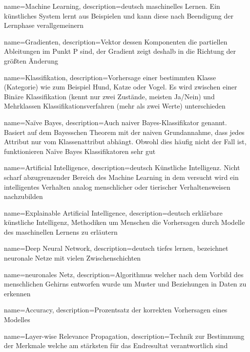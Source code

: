 
{
	name=Machine Learning,
	description={deutsch maschinelles Lernen. Ein künstliches System lernt aus Beispielen und kann diese nach Beendigung der Lernphase verallgemeinern}
}

{
	name=Gradienten,
	description={Vektor dessen Komponenten die partiellen Ableitungen im Punkt P sind, der Gradient zeigt deshalb in die Richtung der größten Änderung}
}

{
	name=Klassifikation,
	description={Vorhersage einer bestimmten Klasse (Kategorie) wie zum Beispiel Hund, Katze oder Vogel. Es wird zwischen einer Binäre Klassifikation (kennt nur zwei Zustände, meisten Ja/Nein) und Mehrklassen Klassifikationsverfahren (mehr als zwei Werte) unterschieden}
}

{
	name=Naïve Bayes,
	description={Auch naiver Bayes-Klassifikator genannt. Basiert auf dem Bayesschen Theorem mit der naiven Grundannahme, dass jedes Attribut nur vom Klassenattribut abhängt. Obwohl dies häufig nicht der Fall ist, funktionieren Naïve Bayes Klassifikatoren sehr gut}
}

{
	name=Artificial Intelligence,
	description={deutsch Künstliche Intelligenz. Nicht scharf abzugrenzender Bereich des Machine Learning in dem versucht wird ein intelligentes Verhalten
	 analog menschlicher oder tierischer Verhaltensweisen nachzubilden}
}

{
	name=Explainable Artificial Intelligence,
	description={deutsch erklärbare künstliche Intelligenz, Methodiken um Menschen die Vorhersagen durch Modelle des maschinellen Lernens zu erläutern}
}

{
    name=Deep Neural Network,
    description={deutsch tiefes lernen, bezeichnet neuronale Netze mit vielen Zwischenschichten}
}

{
	name=neuronales Netz,
	description={Algorithmus welcher nach dem Vorbild des menschlichen Gehirns entworfen wurde um Muster und Beziehungen in Daten zu erkennen}   
}   

{
	name=Accuracy,
	description={Prozentsatz der korrekten Vorhersagen eines Modelles}   
}   

{
	name=Layer-wise Relevance Propagation,
	description={Technik zur Bestimmung der Merkmale welche am stärksten für das Endresultat verantwortlich sind}                                   
}                          

